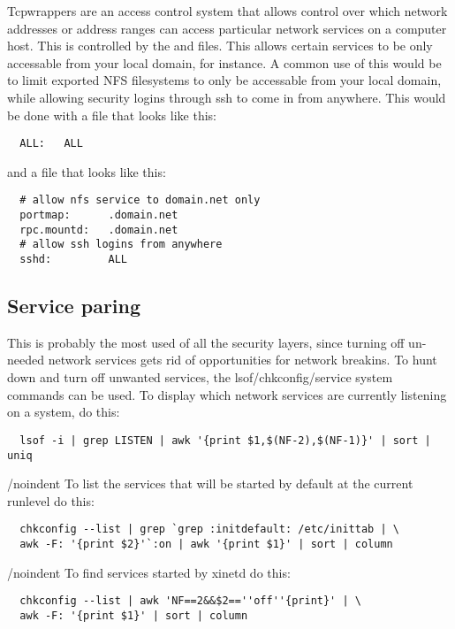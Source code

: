 Tcpwrappers are an access control system that allows control over which
network addresses or address ranges can access particular network services
on a computer host.  This is controlled by the  and
 files. This allows certain services to be only 
accessable from your local domain, for instance.  A common use of this
would be to limit exported NFS filesystems to only be accessable from
your local domain, while allowing security logins through ssh to come
in from anywhere.  This would be done with a  file 
that looks like this:

\begin{verbatim}
  ALL:   ALL
\end{verbatim}

\noindent and a  file that looks like this:

\begin{verbatim}
  # allow nfs service to domain.net only
  portmap:      .domain.net
  rpc.mountd:   .domain.net
  # allow ssh logins from anywhere
  sshd:         ALL
\end{verbatim}

\subsection{Service paring}

This is probably the most used of all the security layers, since turning off
un-needed network services gets rid of opportunities for network breakins.
To hunt down and turn off unwanted services, the lsof/chkconfig/service
system commands can be used. To display which network services are currently
listening on a system, do this:

\begin{verbatim}
  lsof -i | grep LISTEN | awk '{print $1,$(NF-2),$(NF-1)}' | sort | uniq
\end{verbatim}

/noindent To list the services that will be started by default at the current runlevel do this:

\begin{verbatim}
  chkconfig --list | grep `grep :initdefault: /etc/inittab | \
  awk -F: '{print $2}'`:on | awk '{print $1}' | sort | column
\end{verbatim}

/noindent To find services started by xinetd do this:

\begin{verbatim}
  chkconfig --list | awk 'NF==2&&$2==''off''{print}' | \
  awk -F: '{print $1}' | sort | column
\end{verbatim}

